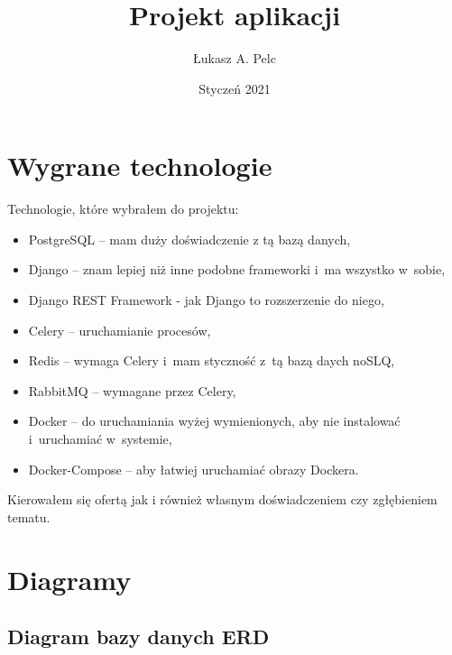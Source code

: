\documentclass[11pt,a4paper]{article}
\title{Projekt aplikacji}
\author{Łukasz A. Pelc}
\date{Styczeń 2021}
\begin{document}
    \thispagestyle{empty}
    \maketitle
    \newpage
    \section{Wygrane technologie}
    Technologie, które wybrałem do projektu:

    \begin{itemize}
        \item PostgreSQL -- mam duży doświadczenie z tą bazą danych,
        \item Django -- znam lepiej niż inne podobne frameworki i~ma wszystko w~sobie,
        \item Django REST Framework - jak Django to rozszerzenie do niego,
        \item Celery -- uruchamianie procesów,
        \item Redis -- wymaga Celery i~mam styczność z~tą bazą daych noSLQ,
        \item RabbitMQ -- wymagane przez Celery,
        \item Docker -- do uruchamiania wyżej wymienionych, aby nie instalować i~uruchamiać w~systemie,
        \item Docker-Compose -- aby łatwiej uruchamiać obrazy Dockera.
    \end{itemize}

    Kierowałem się ofertą jak i również własnym doświadczeniem czy zgłębieniem tematu. \\

    \section{Diagramy}
    \subsection{Diagram bazy danych ERD}
\end{document}
